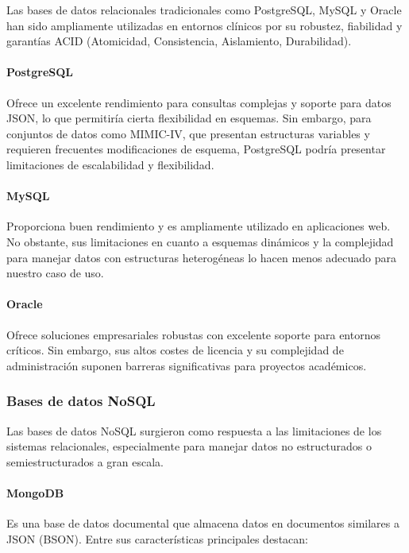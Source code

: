 Las bases de datos relacionales tradicionales como PostgreSQL, MySQL y Oracle han sido ampliamente utilizadas en entornos clínicos por su robustez, fiabilidad y garantías ACID (Atomicidad, Consistencia, Aislamiento, Durabilidad).

\paragraph{PostgreSQL} Ofrece un excelente rendimiento para consultas complejas y soporte para datos JSON, lo que permitiría cierta flexibilidad en esquemas. Sin embargo, para conjuntos de datos como MIMIC-IV, que presentan estructuras variables y requieren frecuentes modificaciones de esquema, PostgreSQL podría presentar limitaciones de escalabilidad y flexibilidad.

\paragraph{MySQL} Proporciona buen rendimiento y es ampliamente utilizado en aplicaciones web. No obstante, sus limitaciones en cuanto a esquemas dinámicos y la complejidad para manejar datos con estructuras heterogéneas lo hacen menos adecuado para nuestro caso de uso.

\paragraph{Oracle} Ofrece soluciones empresariales robustas con excelente soporte para entornos críticos. Sin embargo, sus altos costes de licencia y su complejidad de administración suponen barreras significativas para proyectos académicos.

\subsubsection{Bases de datos NoSQL}

Las bases de datos NoSQL surgieron como respuesta a las limitaciones de los sistemas relacionales, especialmente para manejar datos no estructurados o semiestructurados a gran escala.

\paragraph{MongoDB} Es una base de datos documental que almacena datos en documentos similares a JSON (BSON). Entre sus características principales destacan:

